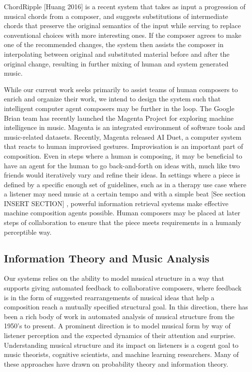 \documentclass[final,authoryear,11pt,times]{elsarticle}
\begin{document}
ChordRipple [Huang 2016] is a recent system that takes as input a progression of musical chords from a composer, and suggests substitutions of intermediate chords that preserve the original semantics of the input while serving to replace conventional choices with more interesting ones. If the composer agrees to make one of the recommended changes, the system then assists the composer in interpolating between original and substituted material before and after the original change, resulting in further mixing of human and system generated music.

While our current work seeks primarily to assist teams of human composers to enrich and organize their work, we intend to design the system such that intelligent computer agent composers may be further in the loop. The Google Brian team has recently launched the Magenta Project for exploring machine intelligence in music. Magenta is an integrated environment of software tools and music-related datasets. Recently, Magenta released AI Duet, a computer system that reacts to human improvised gestures. Improvisation is an important part of composition. Even in steps where a human is composing, it may be beneficial to have an agent for the human to go back-and-forth on ideas with, much like two friends would iteratively vary and refine their ideas. In settings where a piece is defined by a specific enough set of guidelines, such as in a therapy use case where a listener may need music at a certain tempo and with a simple beat [See section INSERT SECTION] , powerful information retrieval systems make effective machine composition agents possible. Human composers may be placed at later steps of collaboration to ensure that the piece meets requirements in a humanly perceptible way.

\subsection{Information Theory and Music Analysis}

Our systems relies on the ability to model musical structure in a way that supports giving automated feedback to collaborative composers, where feedback is in the form of suggested rearrangements of musical ideas that help a composition reach a mutually specified structural goal. In this direction, there has been a rich body of work in automated analysis of musical structure from the 1950's to present. A prominent direction is to model musical form by way of listener perception and the expected dynamics of their attention and surprise. Understanding musical structure and its impact on listeners is a cogent goal to music theorists, cognitive scientists, and machine learning researchers. Many of these approaches have drawn on probability theory and information theory.\\
\end{document}
